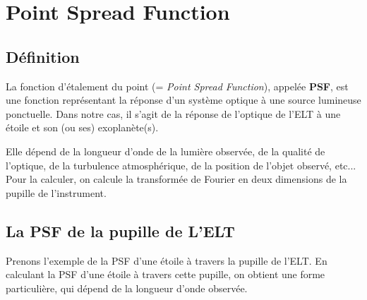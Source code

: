 \newpage
\section{\centering Point Spread Function}

\subsection{Définition}

La fonction d'étalement du point (= \textsl{Point Spread Function}), appelée \textbf{PSF}, est une fonction représentant la réponse d'un système optique à une source lumineuse ponctuelle. Dans notre cas, il s'agit de la réponse de l'optique de l'ELT à une étoile et son (ou ses) exoplanète(s).

Elle dépend de la longueur d'onde de la lumière observée, de la qualité de l'optique, de la turbulence atmosphérique, de la position de l'objet observé, etc... Pour la calculer, on calcule la transformée de Fourier en deux dimensions de la pupille de l'instrument. %

\subsection{La PSF de la pupille de L’ELT}

Prenons l'exemple de la PSF d'une étoile à travers la pupille de l'ELT. En calculant la PSF d'une étoile à travers cette pupille, on obtient une forme particulière, qui dépend de la longueur d'onde observée.

